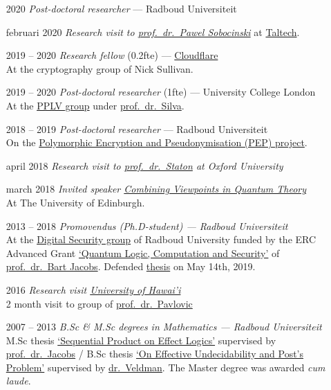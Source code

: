 \documentclass{article}
\newcommand\hsep{ {\color{gray}/} }
\newcommand\partitle[1]{\vskip20pt\par\noindent{\textsf{\textbf{#1}}}}
\begin{document}
\partitle{Academic career}
\begin{itemize}
    \item[2020] \emph{Post-doctoral researcher} --- Radboud Universiteit
    \item[februari 2020] \emph{Research visit to
        \href{https://www.ioc.ee/~pawel/}{prof.~dr.~Pawel Sobocinski}}
            at \href{https://www.taltech.ee}{Taltech}.
    \item[2019 -- 2020] \emph{Research fellow} (0.2fte) --- 
        \href{https://cloudflare.com}{Cloudflare} \\
        At the cryptography group of Nick Sullivan.
    \item[2019 -- 2020] \emph{Post-doctoral researcher} (1fte) --- University
        College London\\
        At the \href{http://pplv.cs.ucl.ac.uk/welcome/}{PPLV group}
            under \href{https://alexandrasilva.org/#/main.html}{prof.~dr.~Silva}.
    \item[2018 -- 2019] \emph{Post-doctoral researcher} --- Radboud Universiteit\\
        On the \href{https://pep.cs.ru.nl}{Polymorphic Encryption and Pseudonymisation (PEP) project}.
    \item[april 2018] \emph{Research visit to \href{http://www.cs.ox.ac.uk/people/samuel.staton/main.html}{prof.~dr.~Staton} at Oxford University}
    \item[march 2018] \emph{Invited speaker \href{http://homepages.inf.ed.ac.uk/cheunen/cvqt/}{Combining Viewpoints in Quantum Theory}}\\
        At The University of Edinburgh.
    \item[2013 -- 2018]  \emph{Promovendus (Ph.D-student) ---
        Radboud Universiteit}\\
        At the \href{http://www.ru.nl/ds/}{Digital Security group}
        of Radboud University funded by
        the ERC Advanced Grant \href{https://cordis.europa.eu/project/rcn/107285_en.html}{`Quantum Logic, Computation and Security'}
        of \href{http://www.cs.ru.nl/B.Jacobs/}{prof.~dr.~Bart Jacobs}.
            Defended
            \href{http://westerbaan.name/~bas/thesis.pdf}{thesis}
            on May 14th, 2019.
    \item[2016] \emph{Research visit \href{http://manoa.hawaii.edu}{University of Hawai'i}}\\
        2 month visit to group of \href{http://dusko.org}{prof.~dr.~Pavlovic}
    \item[2007 -- 2013] \emph{B.Sc \& M.Sc degrees in Mathematics ---
                Radboud Universiteit} \\
        M.Sc thesis \href{www.ru.nl/publish/pages/813276/masterscriptie_bas_westerbaan.pdf}{`Sequential Product on Effect Logics'}
            supervised by \href{http://www.cs.ru.nl/B.Jacobs/}{prof.~dr.~Jacobs} \hsep
        B.Sc thesis \href{https://arxiv.org/abs/1409.1030}{`On Effective Undecidability and Post's Problem'}
            supervised by \href{http://www.ru.nl/wiskunde/@1039532/veldman-dhr-dr-(wim)/}{dr.~Veldman}.
        The Master degree was awarded \emph{cum laude}.
\end{itemize}
\end{document}
